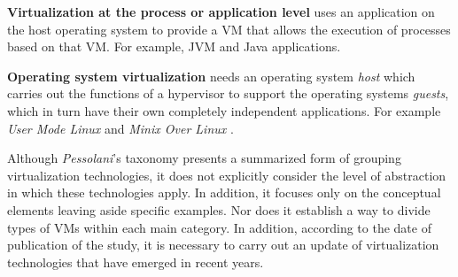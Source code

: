 		\textbf {Virtualization at the process or application level} uses an application on the host operating system to provide a VM that allows the execution of processes based on that VM. For example, JVM and Java applications.
		
		\textbf {Operating system virtualization} needs an operating system \textit{host} which carries out the functions of a hypervisor to support the operating systems \textit{guests}, which in turn have their own completely independent applications. For example \textit{User Mode Linux} \cite{Dike2006} and \textit{Minix Over Linux} \cite{Pessolani2011}.

	
	Although \textit{Pessolani}'s  taxonomy presents a summarized form of grouping virtualization technologies, it does not  explicitly consider the level of abstraction in which these technologies apply. In addition, it focuses only on the conceptual elements leaving aside specific examples. Nor does it establish a way to divide types of VMs within each main category. In addition, according to the date of publication of the study, it is necessary to carry out an update of virtualization technologies that have emerged in recent years.